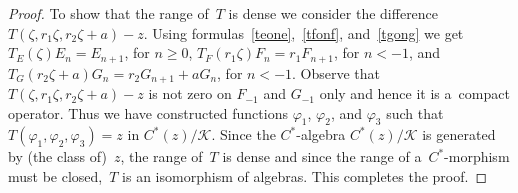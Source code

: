 \begin{proof}
To show that the range of~$T$ is dense we consider the dif\/ference $T(\zeta,r_1\zeta, r_2\zeta+a)-z$.
Using formulas~\eqref{teone},~\eqref{tfonf}, and~\eqref{tgong} we get $T_E(\zeta)E_n=E_{n+1}$, for $n\geq 0$,
$T_F(r_1\zeta)F_n=r_1F_{n+1}$, for $n<-1$, and $T_G(r_2\zeta+a)G_n=r_2G_{n+1}+aG_n$, for $n<-1$.
Observe that $T(\zeta,r_1\zeta, r_2\zeta+a)-z$ is not zero on $F_{-1}$ and $G_{-1}$ only and hence it is a~compact operator.
Thus we have constructed functions $\varphi_1$, $\varphi_2$, and $\varphi_3$ such that $T(\varphi_1,\varphi_2,\varphi_3)
= z$ in $C^*(z)/\mathcal{K}$.
Since the $C^*$-algebra $C^*(z)/\mathcal{K}$ is generated by (the class of)~$z$, the range of~$T$ is dense and since the
range of a~$C^*$-morphism must be closed,~$T$ is an isomorphism of algebras.
This completes the proof.
\end{proof}
